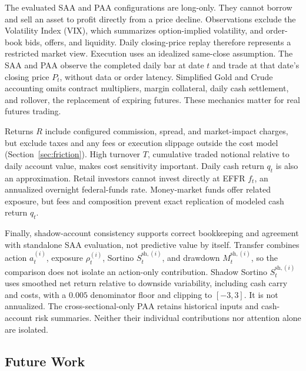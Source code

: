 The evaluated SAA and PAA configurations are long-only. They cannot borrow and sell an asset to profit directly from a price decline. Observations exclude the Volatility Index (VIX), which summarizes option-implied volatility, and order-book bids, offers, and liquidity. Daily closing-price replay therefore represents a restricted market view. Execution uses an idealized same-close assumption. The SAA and PAA observe the completed daily bar at date \(t\) and trade at that date's closing price \(P_t\), without data or order latency. Simplified Gold and Crude accounting omits contract multipliers, margin collateral, daily cash settlement, and rollover, the replacement of expiring futures. These mechanics matter for real futures trading.

Returns \(R\) include configured commission, spread, and market-impact charges, but exclude taxes and any fees or execution slippage outside the cost model (Section~\ref{sec:friction}). High turnover \(T\), cumulative traded notional relative to daily account value, makes cost sensitivity important. Daily cash return \(q_t\) is also an approximation. Retail investors cannot invest directly at EFFR \(f_t\), an annualized overnight federal-funds rate. Money-market funds offer related exposure, but fees and composition prevent exact replication of modeled cash return \(q_t\).

Finally, shadow-account consistency supports correct bookkeeping and agreement with standalone SAA evaluation, not predictive value by itself. Transfer combines action \(a_t^{(i)}\), exposure \(\rho_t^{(i)}\), Sortino \(S_t^{\mathrm{sh},(i)}\), and drawdown \(M_t^{\mathrm{sh},(i)}\), so the comparison does not isolate an action-only contribution. Shadow Sortino \(S_t^{\mathrm{sh},(i)}\) uses smoothed net return relative to downside variability, including cash carry and costs, with a \(0.005\) denominator floor and clipping to \([-3,3]\). It is not annualized. The cross-sectional-only PAA retains historical inputs and cash-account risk summaries. Neither their individual contributions nor attention alone are isolated.

\subsection{Future Work}
\label{sec:future-work}

